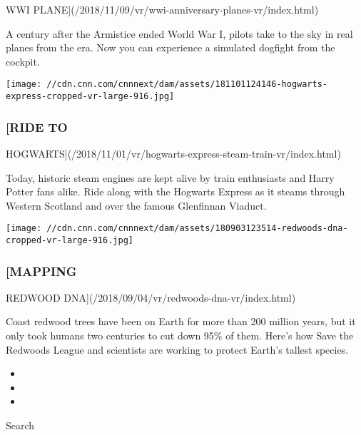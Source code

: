 WWI PLANE{]}(/2018/11/09/vr/wwi-anniversary-planes-vr/index.html)

A century after the Armistice ended World War I, pilots take to the sky
in real planes from the era. Now you can experience a simulated dogfight
from the cockpit.

\href{/2018/11/01/vr/hogwarts-express-steam-train-vr/index.html}{}

\texttt{[image: //cdn.cnn.com/cnnnext/dam/assets/181101124146-hogwarts-express-cropped-vr-large-916.jpg]}

\hypertarget{ride-to}{%
\subsubsection{{[}RIDE TO}\label{ride-to}}

HOGWARTS{]}(/2018/11/01/vr/hogwarts-express-steam-train-vr/index.html)

Today, historic steam engines are kept alive by train enthusiasts and
Harry Potter fans alike. Ride along with the Hogwarts Express as it
steams through Western Scotland and over the famous Glenfinnan Viaduct.

\href{/2018/09/04/vr/redwoods-dna-vr/index.html}{}

\texttt{[image: //cdn.cnn.com/cnnnext/dam/assets/180903123514-redwoods-dna-cropped-vr-large-916.jpg]}

\hypertarget{mapping}{%
\subsubsection{{[}MAPPING}\label{mapping}}

REDWOOD DNA{]}(/2018/09/04/vr/redwoods-dna-vr/index.html)

Coast redwood trees have been on Earth for more than 200 million years,
but it only took humans two centuries to cut down 95\% of them. Here's
how Save the Redwoods League and scientists are working to protect
Earth's tallest species.

\begin{itemize}
\item
\item
\item
\end{itemize}

Search

